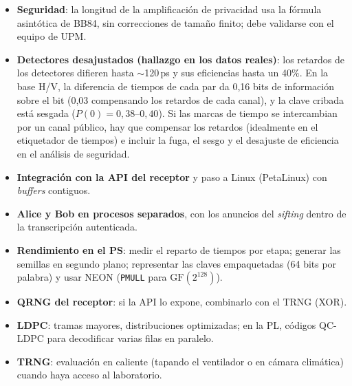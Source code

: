 \documentclass[a4paper,11pt]{article}
\newcommand{\code}[1]{\texttt{#1}}
\begin{document}
\begin{itemize}
  \item \textbf{Seguridad}: la longitud de la amplificación de privacidad usa la fórmula asintótica de BB84, sin
        correcciones de tamaño finito; debe validarse con el equipo de UPM.
  \item \textbf{Detectores desajustados (hallazgo en los datos reales)}: los retardos de los detectores difieren
        hasta $\sim$120\,ps y sus eficiencias hasta un 40\%. En la base H/V, la diferencia de tiempos de cada par
        da 0,16 bits de información sobre el bit (0,03 compensando los retardos de cada canal), y la clave cribada
        está sesgada ($P(0) = 0{,}38$--$0{,}40$). Si las marcas de tiempo se intercambian por un canal público,
        hay que compensar los retardos (idealmente en el etiquetador de tiempos) e incluir la fuga, el sesgo y el
        desajuste de eficiencia en el análisis de seguridad.
  \item \textbf{Integración con la API del receptor} y paso a Linux (PetaLinux) con \emph{buffers} contiguos.
  \item \textbf{Alice y Bob en procesos separados}, con los anuncios del \emph{sifting} dentro de la transcripción autenticada.
  \item \textbf{Rendimiento en el PS}: medir el reparto de tiempos por etapa; generar las semillas en segundo plano;
        representar las claves empaquetadas (64 bits por palabra) y usar NEON (\code{PMULL} para $\mathrm{GF}(2^{128})$).
  \item \textbf{QRNG del receptor}: si la API lo expone, combinarlo con el TRNG (XOR).
  \item \textbf{LDPC}: tramas mayores, distribuciones optimizadas; en la PL, códigos QC-LDPC para decodificar varias filas en paralelo.
  \item \textbf{TRNG}: evaluación en caliente (tapando el ventilador o en cámara climática) cuando haya acceso al laboratorio.
\end{itemize}
\end{document}
